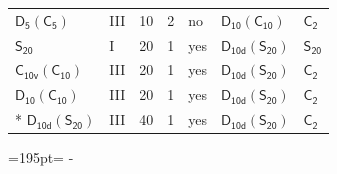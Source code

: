 \documentclass[10pt,a4paper]{article}
\newcommand{\needspace}[1]{\par\penalty-100\begingroup\dimen0=#1\relax\dimen2=\pagegoal
  \advance\dimen2-\pagetotal\ifdim\dimen0>\dimen2\relax\ifdim\dimen2>0pt\vfil\break\fi\fi
  \endgroup}
\numberwithin{equation}{section}
\newcommand{\grp}[1]{\mathsf{#1}}
\begin{document}
{\begin{longtable}{@{}llrrlll@{}}
\href{D5-C5.pdf}{$\grp{D_{5}}(\grp{C_{5}})$} & III & 10 & 2 & no & \href{D10-C10.pdf}{$\grp{D_{10}}(\grp{C_{10}})$} & \href{../../../rotation/data/pdf/C2.pdf}{$\grp{C_{2}}$}\\
\href{../../../rotation/data/pdf/S20.pdf}{$\grp{S_{20}}$} & I & 20 & 1 & yes & \href{D10d-S20.pdf}{$\grp{D_{10d}}(\grp{S_{20}})$} & \href{../../../rotation/data/pdf/S20.pdf}{$\grp{S_{20}}$}\\
\href{C10v-C10.pdf}{$\grp{C_{10v}}(\grp{C_{10}})$} & III & 20 & 1 & yes & \href{D10d-S20.pdf}{$\grp{D_{10d}}(\grp{S_{20}})$} & \href{../../../rotation/data/pdf/C2.pdf}{$\grp{C_{2}}$}\\
\href{D10-C10.pdf}{$\grp{D_{10}}(\grp{C_{10}})$} & III & 20 & 1 & yes & \href{D10d-S20.pdf}{$\grp{D_{10d}}(\grp{S_{20}})$} & \href{../../../rotation/data/pdf/C2.pdf}{$\grp{C_{2}}$}\\*
\href{D10d-S20.pdf}{$\grp{D_{10d}}(\grp{S_{20}})$} & III & 40 & 1 & yes & \href{D10d-S20.pdf}{$\grp{D_{10d}}(\grp{S_{20}})$} & \href{../../../rotation/data/pdf/C2.pdf}{$\grp{C_{2}}$}\\
\bottomrule\end{longtable}}
\needspace{195pt}
\end{document}
